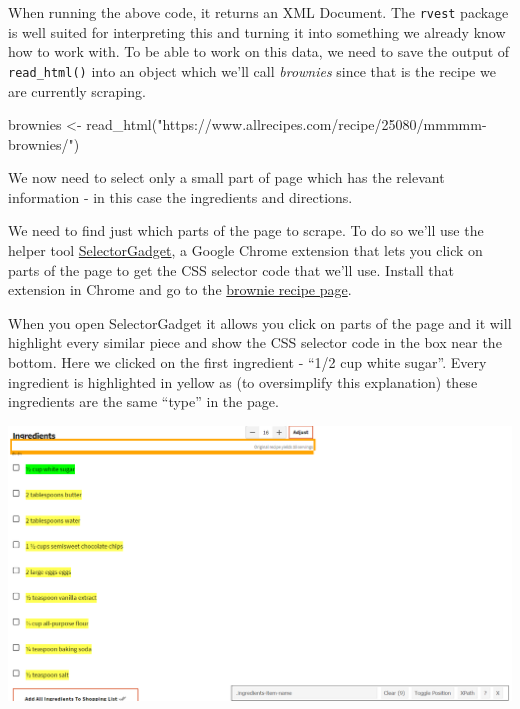 \documentclass[
  12pt,
]{book}
\newenvironment{Shaded}{\begin{snugshade}}{\end{snugshade}}
\newcommand{\FunctionTok}[1]{\textcolor[rgb]{0,0,0}{#1}}
\newcommand{\NormalTok}[1]{#1}
\newcommand{\OtherTok}[1]{\textcolor[rgb]{0.37,0.37,0.37}{#1}}
\newcommand{\StringTok}[1]{\textcolor[rgb]{0.5,0.5,0.5}{#1}}
\begin{document}
When running the above code, it returns an XML Document. The \texttt{rvest} package is well suited for interpreting this and turning it into something we already know how to work with. To be able to work on this data, we need to save the output of \texttt{read\_html()} into an object which we'll call \emph{brownies} since that is the recipe we are currently scraping.

\begin{Shaded}
\begin{Highlighting}[]
\NormalTok{brownies }\OtherTok{\textless{}{-}} \FunctionTok{read\_html}\NormalTok{(}\StringTok{"https://www.allrecipes.com/recipe/25080/mmmmm{-}brownies/"}\NormalTok{)}
\end{Highlighting}
\end{Shaded}

We now need to select only a small part of page which has the relevant information - in this case the ingredients and directions.

We need to find just which parts of the page to scrape. To do so we'll use the helper tool \href{https://selectorgadget.com/}{SelectorGadget}, a Google Chrome extension that lets you click on parts of the page to get the CSS selector code that we'll use. Install that extension in Chrome and go to the \href{https://www.allrecipes.com/recipe/25080/mmmmm-brownies/?internalSource=hub\%20recipe\&referringContentType=Search}{brownie recipe page}.

When you open SelectorGadget it allows you click on parts of the page and it will highlight every similar piece and show the CSS selector code in the box near the bottom. Here we clicked on the first ingredient - ``1/2 cup white sugar''. Every ingredient is highlighted in yellow as (to oversimplify this explanation) these ingredients are the same ``type'' in the page.

\includegraphics{images/brownies_3.PNG}
\end{document}
